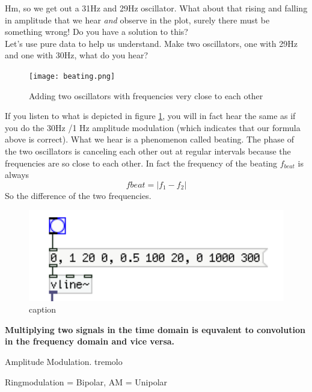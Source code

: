 Hm, so we get out a 31Hz and 29Hz oscillator. What about that rising and falling in amplitude that we hear \textit{and} observe in the plot, surely there must be something wrong! Do you have a solution to this?\\

Let's use pure data to help us understand. Make two oscillators, one with 29Hz and one with 30Hz, what do you hear?

\begin{figure}[h!]
	\centering
	\texttt{[image: beating.png]}
	\caption[adding two oscillators]
	{Adding two oscillators with frequencies very close to each other}
	\label{fig:beating}
\end{figure}

If you listen to what is depicted in figure \ref{fig:beating}, you will in fact hear the same as if you do the 30Hz /1 Hz amplitude modulation (which indicates that our formula above is correct). What we hear is a phenomenon called beating. The phase of the two oscillators is canceling each other out at regular intervals because the frequencies are so close to each other. In fact the frequency of the beating $f_{beat}$ is always 
\begin{equation}
	f{beat}=|f_1-f_2|
\end{equation}
So the difference of the two frequencies.



\begin{figure}[H]
	\begin{center}
		\includegraphics[width = 14cm]{img/simpleEnv.png}
		\caption{caption}
		\label{fig:name}
	\end{center}
\end{figure}

\textbf{Multiplying two signals in the time domain is equvalent to convolution in the frequency domain and vice versa.
}


Amplitude Modulation. \glqq{}tremolo\grqq{}

Ringmodulation = Bipolar,
AM = Unipolar

